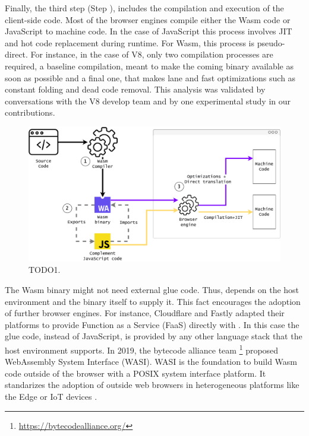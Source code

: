 Finally, the third step (Step ), includes the compilation and execution of the client-side code. Most of the browser engines compile either the Wasm code or JavaScript to machine code. In the case of JavaScript this process involves JIT and hot code replacement during runtime. For Wasm, this process is pseudo-direct. For instance, in the case of V8, only two compilation processes are required, a baseline compilation, meant to make the coming binary available as soon as possible and a final one, that makes lane and fast optimizations such as constant folding and dead code removal. This analysis was validated by conversations with the V8 develop team and by one experimental study in our contributions.  

\begin{figure}[h]
    \centering
    \includegraphics[width=\linewidth]{diagrams/wasm_workflow.pdf}
    \caption{TODO1.}
    \label{diagrams:sota:wasm}
\end{figure}

The Wasm binary might not need external glue code. Thus, depends on the host environment and the binary itself to supply it. This fact encourages the adoption of \wasm further browser engines. For instance, Cloudflare and Fastly adapted their platforms to provide Function as a Service (FaaS) directly with \wasm. In this case the glue code, instead of JavaScript, is provided by any other language stack that the host environment supports.
In 2019, the bytecode alliance team \footnote{\url{https://bytecodealliance.org/}} proposed WebAssembly System Interface (WASI). WASI is the foundation to build Wasm code outside of the browser with a POSIX system interface platform. It standarizes the adoption of \wasm outside web browsers \cite{bryant2020webassembly} in heterogeneous platforms like the Edge or IoT devices \cite{Narayan2021Swivel,Sledge}. 

